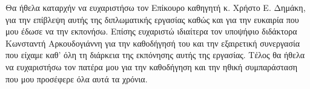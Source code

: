 \begin{acknowledgements}
Θα ήθελα καταρχήν να ευχαριστήσω τον Επίκουρο καθηγητή κ. Χρήστο Ε. Δημάκη, για την επίβλεψη αυτής της διπλωματικής εργασίας καθώς και για την ευκαιρία που μου έδωσε να την εκπονήσω. Επίσης ευχαριστώ ιδιαίτερα τον υποψήφιο διδάκτορα Κωνσταντή Αρκουδογιάννη για την καθοδήγησή του και την εξαιρετική συνεργασία που είχαμε καθ' όλη τη διάρκεια της εκπόνησης αυτής της εργασίας. Τέλος θα ήθελα να ευχαριστήσω τον πατέρα μου για την καθοδήγηση και την ηθική συμπαράσταση που μου προσέφερε όλα αυτά τα χρόνια.
\end{acknowledgements}
